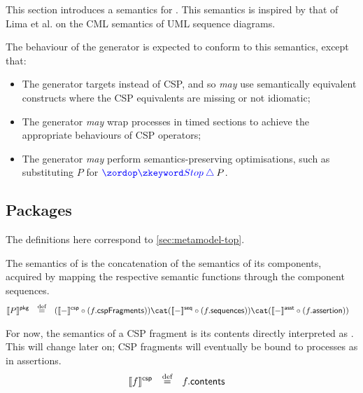 
This section introduces a \tockcsp{} semantics for \langname.
This semantics is inspired by that of Lima et al. on the CML semantics of
UML sequence diagrams.

The behaviour of the \langname{} generator is expected to conform to
this semantics, except that:

\begin{itemize}
\item
	The generator targets \cspm{} instead of CSP, and so \emph{may}
	use semantically equivalent \cspm{} constructs where the CSP equivalents
	are missing or not idiomatic;
\item
	The generator \emph{may}  wrap processes in
	timed sections to achieve the appropriate \tockcsp{} behaviours of
	CSP operators;
\item
	The generator \emph{may} perform semantics-preserving optimisations,
	such as substituting \(P\) for \(\tlang{\Stop \interrupt{}}P\).
\end{itemize}


\subsection{Packages}\label{ssec:semantics-tockcsp-top}

The definitions here correspond to \cref{sec:metamodel-top}.

\begin{defn}[\mrapackage]
The semantics of \mrapackage{} is the concatenation of the semantics of its
components, acquired by mapping the respective semantic functions through the
component sequences.
%
\begin{align*}
	\pkgsema{\apkg}
\quad\defeq\quad&
	(\cspsema{-} \circ (\field{\acsp}{cspFragments}))
\cat
	(\seqsema{-} \circ (\field{\acsp}{sequences}))
\cat
	(\asstsema{-} \circ (\field{\acsp}{assertion}))
\end{align*}
\end{defn}

\begin{defn}[\mcspfragment]
For now, the semantics of a CSP fragment is its contents directly interpreted
as \tockcsp.  This will change later on; CSP fragments will eventually be bound
to processes as in \robochart{} assertions.
%
\begin{align*}
	\llbracket f \rrbracket^{\mathsf{csp}}
\quad\mathbin{\overset{\text{def}}=}\quad&
	f.\mathsf{contents}
\end{align*}
\end{defn}


